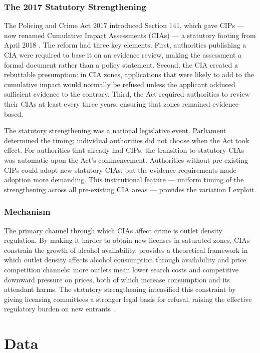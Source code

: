 \documentclass[12pt]{article}
\begin{document}
\subsubsection*{The 2017 Statutory Strengthening} The Policing and Crime Act 2017 introduced Section 141, which gave CIPs --- now renamed Cumulative Impact Assessments (CIAs) --- a statutory footing from April 2018 \citep{policingcrimeact2017}. The reform had three key elements. First, authorities publishing a CIA were required to base it on an evidence review, making the assessment a formal document rather than a policy statement. Second, the CIA created a rebuttable presumption: in CIA zones, applications that were likely to add to the cumulative impact would normally be refused unless the applicant adduced sufficient evidence to the contrary. Third, the Act required authorities to review their CIAs at least every three years, ensuring that zones remained evidence-based.

The statutory strengthening was a national legislative event. Parliament determined the timing; individual authorities did not choose when the Act took effect. For authorities that already had CIPs, the transition to statutory CIAs was automatic upon the Act's commencement. Authorities without pre-existing CIPs could adopt new statutory CIAs, but the evidence requirements made adoption more demanding. This institutional feature --- uniform timing of the strengthening across all pre-existing CIA areas --- provides the variation I exploit.

\subsubsection*{Mechanism} The primary channel through which CIAs affect crime is outlet density regulation. By making it harder to obtain new licenses in saturated zones, CIAs constrain the growth of alcohol availability. \citet{gruenewald2007localized} provides a theoretical framework in which outlet density affects alcohol consumption through availability and price competition channels: more outlets mean lower search costs and competitive downward pressure on prices, both of which increase consumption and its attendant harms. The statutory strengthening intensified this constraint by giving licensing committees a stronger legal basis for refusal, raising the effective regulatory burden on new entrants \citep{hadfield2006bar}.


\section{Data}
\label{sec:data}
\end{document}
